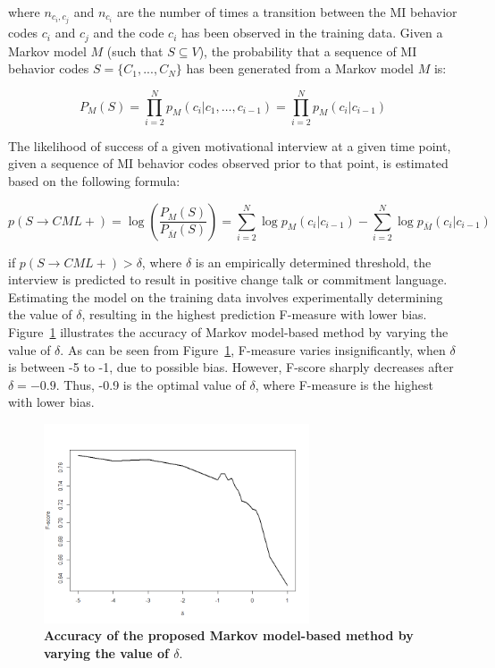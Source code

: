 \documentclass{amia}
\begin{document}
where $n_{c_i,c_j}$ and $n_{c_i}$ are the number of times a transition between the MI behavior codes $c_i$ and $c_j$ and the code $c_i$ has been observed in the training data. Given a Markov model $M$ (such that $S\subseteq V$), the probability that a sequence of MI behavior codes $S = \{C_1,...,C_N\}$ has been generated from a Markov model $M$ is:

\begin{equation}
P_M(S) = \prod_{i=2}^N p_M(c_i|c_1,\dots,c_{i-1})=\prod_{i=2}^N p_M(c_i|c_{i-1})
\end{equation}

The likelihood of success of a given motivational interview at a given time point, given a sequence of MI behavior codes observed prior to that point, is estimated based on the following formula:

\begin{equation}
p(S\rightarrow CML+) = \log\left(\frac{P_M(S)}{P_{\overline M}(S)}\right)= \sum_{i=2}^N \log p_M(c_i|c_{i-1})-\sum_{i=2}^N \log p_{\overline M}(c_i|c_{i-1})\label{eq:class}
\end{equation}

if $p(S\rightarrow CML+) > \delta $, where $\delta$ is an empirically determined threshold, the interview is predicted to result in positive change talk or commitment language. Estimating the model on the training data involves experimentally determining the value of $\delta$, resulting in the highest prediction F-measure with lower bias. Figure~\ref{fig:delta} illustrates the accuracy of Markov model-based method by varying the value of $\delta$. As can be seen from Figure~\ref{fig:delta}, F-measure varies insignificantly, when $\delta $ is between -5 to -1, due to possible bias. However, F-score sharply decreases after $\delta = -0.9$. Thus, -0.9 is the optimal value of $\delta $, where F-measure is the highest with lower bias. 

\begin{figure}[htb!]
    \centering
    \includegraphics[width=0.70\textwidth]{figures/delta.png}
    \caption{\textbf{Accuracy of the proposed Markov model-based method by varying the value of $\delta$}.}
    \label{fig:delta}
\end{figure}
\end{document}
